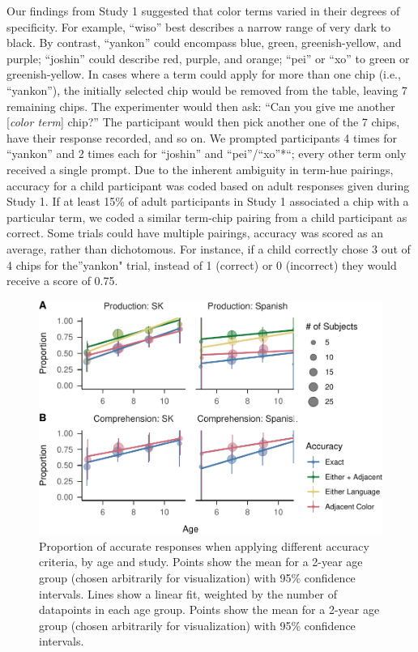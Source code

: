 \documentclass[
  english,
  ,man,floatsintext]{apa6}
\begin{document}
Our findings from Study 1 suggested that color terms varied in their degrees of specificity. For example, \enquote{wiso} best describes a narrow range of very dark to black. By contrast, \enquote{yankon} could encompass blue, green, greenish-yellow, and purple; \enquote{joshin} could describe red, purple, and orange; \enquote{pei} or \enquote{xo} to green or greenish-yellow. In cases where a term could apply for more than one chip (i.e., \enquote{yankon}), the initially selected chip would be removed from the table, leaving 7 remaining chips. The experimenter would then ask: \enquote{Can you give me another {[}\emph{color term}{]} chip?} The participant would then pick another one of the 7 chips, have their response recorded, and so on. We prompted participants 4 times for \enquote{yankon} and 2 times each for \enquote{joshin} and \enquote{pei}/\enquote{xo}*\enquote{; every other term only received a single prompt. Due to the inherent ambiguity in term-hue pairings, accuracy for a child participant was coded based on adult responses given during Study 1. If at least 15\% of adult participants in Study 1 associated a chip with a particular term, we coded a similar term-chip pairing from a child participant as correct. Some trials could have multiple pairings, accuracy was scored as an average, rather than dichotomous. For instance, if a child correctly chose 3 out of 4 chips for the}yankon" trial, instead of 1 (correct) or 0 (incorrect) they would receive a score of 0.75.

\begin{figure}
\centering
\includegraphics{amazon_color_files/figure-latex/study23-accuracy-1.pdf}
\caption{\label{fig:study23-accuracy}Proportion of accurate responses when applying different accuracy criteria, by age and study. Points show the mean for a 2-year age group (chosen arbitrarily for visualization) with 95\% confidence intervals. Lines show a linear fit, weighted by the number of datapoints in each age group. Points show the mean for a 2-year age group (chosen arbitrarily for visualization) with 95\% confidence intervals.}
\end{figure}
\end{document}
